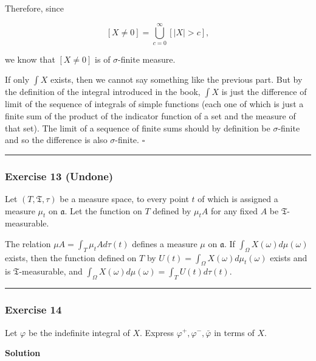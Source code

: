 \documentclass[
]{article}
\begin{document}
Therefore, since

\[[X \ne 0] = \bigcup_{c=0}^\infty\left[ |X| > c \right],\]

we know that \([X \ne 0]\) is of \(\sigma\)-finite measure.

If only \(\int X\) exists, then we cannot say something like the
previous part. But by the definition of the integral introduced in the
book, \(\int X\) is just the difference of limit of the sequence of
integrals of simple functions (each one of which is just a finite sum of
the product of the indicator function of a set and the measure of that
set). The limit of a sequence of finite sums should by definition be
\(\sigma\)-finite and so the difference is also \(\sigma\)-finite.
\(\square\)

\begin{center}\rule{0.5\linewidth}{0.5pt}\end{center}

\hypertarget{exercise-13-undone}{%
  \subsubsection{Exercise 13 (Undone)}\label{exercise-13-undone}}

Let \((T, \mathfrak T, \tau)\) be a measure space, to every point \(t\)
of which is assigned a measure \(\mu_t\) on \(\mathfrak a\). Let the
function on \(T\) defined by \(\mu_t A\) for any fixed \(A\) be
\(\mathfrak T\)-measurable.

The relation \(\mu A=\int_T \mu_t A d \tau(t)\) defines a measure
\(\mu\) on \(\mathfrak a\). If \(\int_{\Omega} X(\omega) d \mu(\omega)\)
exists, then the function defined on \(T\) by
\(U(t)=\int_{\Omega} X(\omega) d \mu_t(\omega)\) exists and is
\(\mathfrak T\)-measurable, and
\(\int_{\Omega} X(\omega) d \mu(\omega)=\int_T U(t) d \tau(t)\).

\begin{center}\rule{0.5\linewidth}{0.5pt}\end{center}

\hypertarget{exercise-14-2}{%
  \subsubsection{Exercise 14}\label{exercise-14-2}}

Let \(\varphi\) be the indefinite integral of \(X\). Express
\(\varphi^{+}, \varphi^{-}, \bar{\varphi}\) in terms of \(X\).

\textbf{Solution}
\end{document}
